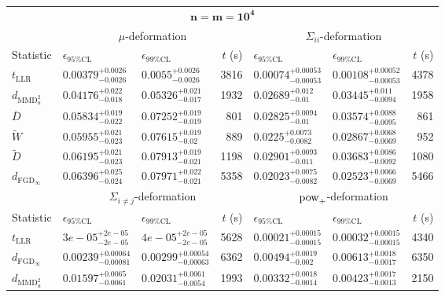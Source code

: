 \begin{tabular}{l|llr|llr}
	\toprule
	\multicolumn{7}{c}{$\mathbf{n=m=10^{4}}$} \\
	\multicolumn{1}{c}{} & \multicolumn{3}{c}{$\mu$-deformation} & \multicolumn{3}{c}{$\Sigma_{ii}$-deformation} \\
	Statistic & $\epsilon_{95\%\mathrm{CL}}$ & $\epsilon_{99\%\mathrm{CL}}$ & $t$ (s) & $\epsilon_{95\%\mathrm{CL}}$ & $\epsilon_{99\%\mathrm{CL}}$ & $t$ (s) \\
	\midrule
	$t_{\mathrm{LLR}}$ & $0.00379_{-0.0026}^{+0.0026}$ & $0.0055_{-0.0026}^{+0.0026}$ & 3816 & $0.00074_{-0.00053}^{+0.00053}$ & $0.00108_{-0.00053}^{+0.00052}$ & 4378 \\
	$d_{\mathrm{MMD}^{2}_{u}}$ & $0.04176_{-0.018}^{+0.022}$ & $0.05326_{-0.017}^{+0.021}$ & 1932 & $0.02689_{-0.01}^{+0.012}$ & $0.03445_{-0.0094}^{+0.011}$ & 1958 \\
	$\overline{D}$ & $0.05834_{-0.022}^{+0.019}$ & $0.07252_{-0.019}^{+0.019}$ & 801 & $0.02825_{-0.01}^{+0.0094}$ & $0.03574_{-0.0095}^{+0.0088}$ & 861 \\
	$\widetilde{W}$ & $0.05955_{-0.023}^{+0.021}$ & $0.07615_{-0.02}^{+0.019}$ & 889 & $0.0225_{-0.0082}^{+0.0073}$ & $0.02867_{-0.0069}^{+0.0068}$ & 952 \\
	$\widetilde{D}$ & $0.06195_{-0.023}^{+0.021}$ & $0.07913_{-0.021}^{+0.019}$ & 1198 & $0.02901_{-0.011}^{+0.0093}$ & $0.03683_{-0.0092}^{+0.0086}$ & 1080 \\
	$d_{\mathrm{FGD}_{\infty}}$ & $0.06396_{-0.024}^{+0.025}$ & $0.07971_{-0.021}^{+0.022}$ & 5358 & $0.02023_{-0.0082}^{+0.0075}$ & $0.02523_{-0.0069}^{+0.0066}$ & 5466 \\
	\toprule
	\multicolumn{1}{c}{} & \multicolumn{3}{c}{$\Sigma_{i\neq j}$-deformation} & \multicolumn{3}{c}{$\rm{pow}_{+}$-deformation} \\
	Statistic & $\epsilon_{95\%\mathrm{CL}}$ & $\epsilon_{99\%\mathrm{CL}}$ & $t$ (s) & $\epsilon_{95\%\mathrm{CL}}$ & $\epsilon_{99\%\mathrm{CL}}$ & $t$ (s) \\
	\midrule
	$t_{\mathrm{LLR}}$ & $3e-05_{-2e-05}^{+2e-05}$ & $4e-05_{-2e-05}^{+2e-05}$ & 5628 & $0.00021_{-0.00015}^{+0.00015}$ & $0.00032_{-0.00015}^{+0.00015}$ & 4340 \\
	$d_{\mathrm{FGD}_{\infty}}$ & $0.00239_{-0.00081}^{+0.00064}$ & $0.00299_{-0.00063}^{+0.00054}$ & 6362 & $0.00494_{-0.002}^{+0.0019}$ & $0.00613_{-0.0017}^{+0.0018}$ & 6350 \\
	$d_{\mathrm{MMD}^{2}_{u}}$ & $0.01597_{-0.0061}^{+0.0065}$ & $0.02031_{-0.0054}^{+0.0061}$ & 1993 & $0.00332_{-0.0014}^{+0.0018}$ & $0.00423_{-0.0013}^{+0.0017}$ & 2150 \\

\end{tabular}
